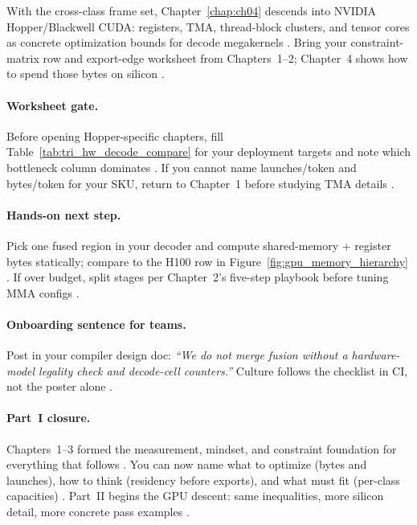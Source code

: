 With the cross-class frame set, Chapter~\ref{chap:ch04} descends into NVIDIA Hopper/Blackwell CUDA: registers, TMA, thread-block clusters, and tensor cores as concrete optimization bounds for decode megakernels \citep{nvidia2022hopper,semianalysis2024tma}.
Bring your constraint-matrix row and export-edge worksheet from Chapters~1--2; Chapter~4 shows how to spend those bytes on silicon \citep{memoryfloor2026}.

\paragraph{Worksheet gate.}
Before opening Hopper-specific chapters, fill Table~\ref{tab:tri_hw_decode_compare} for your deployment targets and note which bottleneck column dominates \citep{taxbreak2026,memoryfloor2026,patel2025llminference}.
If you cannot name launches/token and bytes/token for your SKU, return to Chapter~1 before studying TMA details \citep{nvidia2022hopper,semianalysis2024tma}.

\paragraph{Hands-on next step.}
Pick one fused region in your decoder and compute shared-memory + register bytes statically; compare to the H100 row in Figure~\ref{fig:gpu_memory_hierarchy} \citep{nvidia2022hopper}.
If over budget, split stages per Chapter~2's five-step playbook before tuning MMA configs \citep{chen2020compilerbasedhardw,yirage2026,memoryfloor2026}.

\paragraph{Onboarding sentence for teams.}
Post in your compiler design doc: \emph{``We do not merge fusion without a hardware-model legality check and decode-cell counters.''} \citep{yirage2026,taxbreak2026,memoryfloor2026}
Culture follows the checklist in CI, not the poster alone \citep{patel2025llminference}.

\paragraph{Part~I closure.}
Chapters~1--3 formed the measurement, mindset, and constraint foundation for everything that follows \citep{taxbreak2026,memoryfloor2026,chen2020compilerbasedhardw}.
You can now name what to optimize (bytes and launches), how to think (residency before exports), and what must fit (per-class capacities) \citep{yirage2026,patel2025llminference}.
Part~II begins the GPU descent: same inequalities, more silicon detail, more concrete pass examples \citep{nvidia2022hopper,semianalysis2024tma}.

